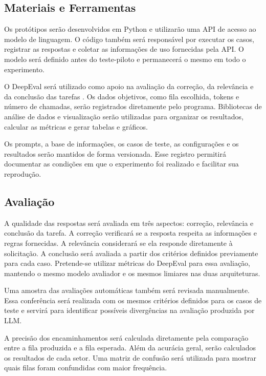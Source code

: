 \documentclass[11pt]{ifscarticle}
\begin{document}
\subsection{Materiais e Ferramentas}

Os protótipos serão desenvolvidos em Python e utilizarão uma API de acesso ao modelo de linguagem. O código também será responsável por executar os casos, registrar as respostas e coletar as informações de uso fornecidas pela API. O modelo será definido antes do teste-piloto e permanecerá o mesmo em todo o experimento.

O DeepEval será utilizado como apoio na avaliação da correção, da relevância e da conclusão das tarefas \cite{deepeval}. Os dados objetivos, como fila escolhida, tokens e número de chamadas, serão registrados diretamente pelo programa. Bibliotecas de análise de dados e visualização serão utilizadas para organizar os resultados, calcular as métricas e gerar tabelas e gráficos.

Os prompts, a base de informações, os casos de teste, as configurações e os resultados serão mantidos de forma versionada. Esse registro permitirá documentar as condições em que o experimento foi realizado e facilitar sua reprodução.

\subsection{Avaliação}

A qualidade das respostas será avaliada em três aspectos: correção, relevância e conclusão da tarefa. A correção verificará se a resposta respeita as informações e regras fornecidas. A relevância considerará se ela responde diretamente à solicitação. A conclusão será avaliada a partir dos critérios definidos previamente para cada caso. Pretende-se utilizar métricas do DeepEval para essa avaliação, mantendo o mesmo modelo avaliador e os mesmos limiares nas duas arquiteturas.

Uma amostra das avaliações automáticas também será revisada manualmente. Essa conferência será realizada com os mesmos critérios definidos para os casos de teste e servirá para identificar possíveis divergências na avaliação produzida por LLM.

A precisão dos encaminhamentos será calculada diretamente pela comparação entre a fila produzida e a fila esperada. Além da acurácia geral, serão calculados os resultados de cada setor. Uma matriz de confusão será utilizada para mostrar quais filas foram confundidas com maior frequência.
\end{document}
